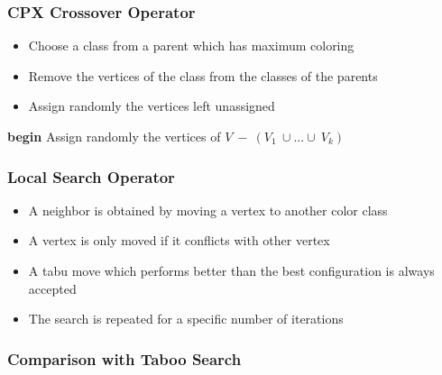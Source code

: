 \documentclass{beamer}
\begin{document}
\begin{frame}
\frametitle{CPX Crossover Operator}
\begin{multicols}{2}
\begin{itemize}
\item Choose a class from a parent which has maximum coloring
\item Remove the vertices of the class from the classes of the parents
\item Assign randomly the vertices left unassigned
\end{itemize}
\columnbreak
\tiny{
\begin{algorithm}[H]
{\bf begin}\;
Assign randomly the vertices of $V\ -\ (V_1\ \cup ... \cup\ V_k)$\;
\end{algorithm}
}
\end{multicols}

\end{frame}

\begin{frame}

\frametitle{Local Search Operator}

\begin{itemize}

\item A neighbor is obtained by moving a vertex to another color class
\item A vertex is only moved if it conflicts with other vertex
\item A tabu move which performs better than the best configuration is always accepted
\item The search is repeated for a specific number of iterations

\end{itemize}

\end{frame}

\begin{frame}
\frametitle{Comparison with Taboo Search}

\end{frame}
\end{document}
